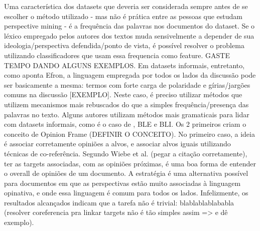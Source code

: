 Uma característica dos datasets que deveria ser considerada sempre antes de se escolher o método utilizado - mas não é prática entre as pessoas que estudam perspective mining - é a frequência das palavras nos documentos do dataset. Se o léxico empregado pelos autores dos textos muda sensivelmente a depender de sua ideologia/perspectiva defendida/ponto de vista, é possível resolver o problema utilizando classificadores que usam essa frequencia como feature. GASTE TEMPO DANDO ALGUNS EXEMPLOS.  Em datasets informais, entretanto, como aponta Efron, a linguagem empregada por todos os lados da discussão pode ser basicamente a mesma: termos com forte carga de polaridade e gírias/jargões comuns na discussão [EXEMPLO]. Neste caso, é preciso utilizar métodos que utilizem mecanismos mais rebuscados do que a simples frequência/presença das palavras no texto. Alguns autores utilizam métodos mais gramaticais para lidar com datasets informais, como é o caso de , BLE e BLI. Os 2 primeiros criam o conceito de Opinion Frame (DEFINIR O CONCEITO). No primeiro caso, a ideia é associar corretamente opiniões a alvos, e associar alvos iguais utilizando técnicas de co-referência. Segundo Wiebe et al. (pegar a citação corretamente), ter as targets associadas, com as opiniões próximas, é uma boa forma de entender o overall de opiniões de um documento. A estratégia é uma alternativa possível para documentos em que as perspectivas estão muito associadas à linguagem opinativa, e onde essa linguagem é comum para todos os lados. Infelizmente, os resultados alcançados indicam que a tarefa não é trivial: blablablablababla (resolver coreferencia pra linkar targets não é tão simples assim => e dê exemplo). 


